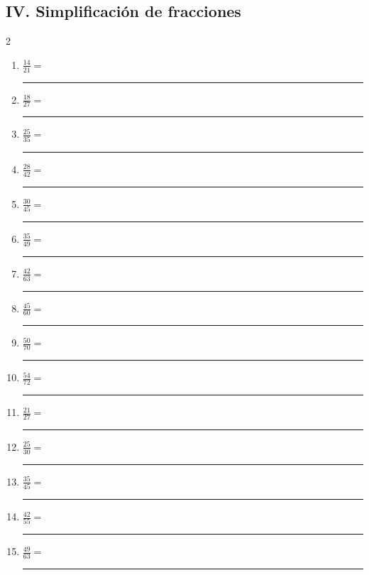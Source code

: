 \documentclass[11pt]{article}
\begin{document}
\subsection*{IV. Simplificación de fracciones}
\begin{multicols}{2}\begin{enumerate}[leftmargin=*,start=51]
\item $\displaystyle \frac{14}{21}=$ \rule{2.1cm}{0.4pt}
\item $\displaystyle \frac{18}{27}=$ \rule{2.1cm}{0.4pt}
\item $\displaystyle \frac{25}{35}=$ \rule{2.1cm}{0.4pt}
\item $\displaystyle \frac{28}{42}=$ \rule{2.1cm}{0.4pt}
\item $\displaystyle \frac{30}{45}=$ \rule{2.1cm}{0.4pt}
\item $\displaystyle \frac{35}{49}=$ \rule{2.1cm}{0.4pt}
\item $\displaystyle \frac{42}{63}=$ \rule{2.1cm}{0.4pt}
\item $\displaystyle \frac{45}{60}=$ \rule{2.1cm}{0.4pt}
\item $\displaystyle \frac{50}{70}=$ \rule{2.1cm}{0.4pt}
\item $\displaystyle \frac{54}{72}=$ \rule{2.1cm}{0.4pt}
\item $\displaystyle \frac{21}{27}=$ \rule{2.1cm}{0.4pt}
\item $\displaystyle \frac{25}{30}=$ \rule{2.1cm}{0.4pt}
\item $\displaystyle \frac{35}{45}=$ \rule{2.1cm}{0.4pt}
\item $\displaystyle \frac{42}{55}=$ \rule{2.1cm}{0.4pt}
\item $\displaystyle \frac{49}{63}=$ \rule{2.1cm}{0.4pt}
\end{enumerate}\end{multicols}
\end{document}
